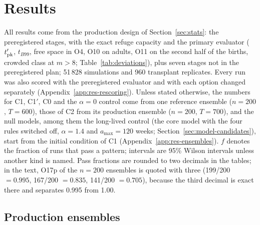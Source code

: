 \section{Results}
\label{sec:results}

All results come from the production design of Section~\ref{sec:stats}: the preregistered stages, with the
exact refuge capacity and the primary evaluator ($t'_{\rm pk}$, $t_{B99}$, free space in O4, O10
on adults, O11 on the second half of the births, crowded class at $m>8$; Table~\ref{tab:deviations}), plus seven
stages not in the preregistered plan; 51\,828 simulations and 960 transplant replicates. Every run was also scored with the preregistered
evaluator and with each option changed separately (Appendix~\ref{app:res-rescoring}). Unless stated otherwise, the
numbers for \textsf{C1}, \textsf{C1}$'$, \textsf{C0} and the $\alpha=0$ control come from one reference ensemble
($n=200$, $T=600$), those of \textsf{C2} from its production ensemble ($n=200$, $T=700$), and the null models, among them the long-lived
control (the core model with the four rules switched off, $\alpha=1.4$ and $a_{\max}=120$ weeks;
Section~\ref{sec:model-candidates}), start from the initial condition of \textsf{C1} (Appendix~\ref{app:res-ensembles}). $f$ denotes the
fraction of runs that pass a pattern; intervals are 95\% Wilson intervals unless another kind is named. Pass
fractions are rounded to two decimals in the tables; in the text, O17p of the $n=200$ ensembles is quoted with three
(199/200 $=0.995$, 167/200 $=0.835$, 141/200 $=0.705$), because the third decimal is exact there and separates 0.995
from 1.00.

\subsection{Production ensembles}
\label{sec:res-production}

